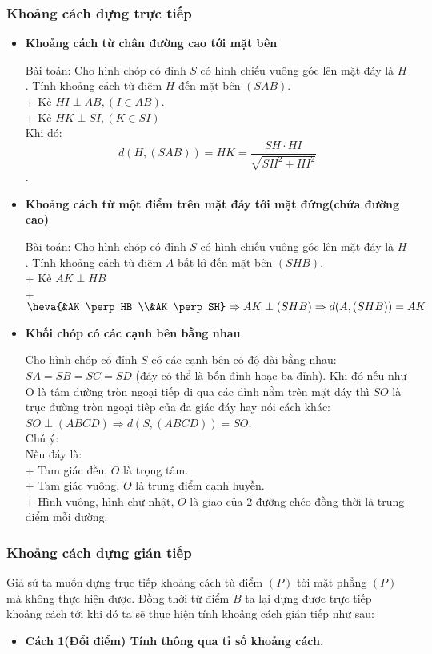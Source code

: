 \begin{khung}
\begin{itemize}
\end{itemize}
	\subsubsection{Khoảng cách dựng trực tiếp}
	\begin{itemize}
		\item \textbf{Khoảng cách từ chân đường cao tới mặt bên }
		
		Bài toán: Cho hình chóp có đỉnh $S$ có hình chiếu vuông góc lên mặt đáy là $H$. Tính khoảng cách từ điêm $H$ đến mặt bên $(S A B)$.\\
		+ Kẻ $H I \perp A B,(I \in A B)$.\\
		+ Kẻ $H K \perp S I,(K \in S I)$\\
		Khi đó: $$d(H,(S A B))=HK=\dfrac{SH \cdot HI}{\sqrt{S H^2+H I^2}}$$.\\
		
		\item \textbf{Khoảng cách từ một điểm trên mặt đáy tới mặt đứng(chứa đường cao)}
		
		Bài toán: Cho hình chóp có đỉnh $S$ có hình chiếu vuông góc lên mặt đáy là $H$. Tính khoảng cách tù điêm $A$ bất  kì đến mặt bên $(SHB)$.\\
		
		+ Kẻ $A K \perp H B$\\
		+ $\heva{&AK \perp HB \\&AK \perp SH} \Rightarrow AK \perp(SHB) \Rightarrow d(A,(S H B))=A K$
	
		\item \textbf{Khối chóp có các cạnh bên bằng nhau}
		
		Cho hình chóp có đỉnh $S$ có các cạnh bên có độ dài bằng nhau: $S A=S B=S C=S D$ (đáy có thể là bốn đỉnh hoạc ba đỉnh). Khi đó nếu như O là tâm đường tròn ngoại tiếp đi qua các đỉnh nằm trên mặt đáy thì $SO$ là trục đường tròn ngoại tiêp của đa giác đáy hay nói cách khác: $S O \perp(A B C D) \Rightarrow d(S,(A B C D))=S O$.\\
		Chú ý:\\
		Nếu đáy là:\\
		+ Tam giác đều, $O$ là trọng tâm.\\
		+ Tam giác vuông, $O$ là trung điểm cạnh huyền.\\
		+ Hình vuông, hình chữ nhật, $O$ là giao của 2 đường chéo đồng thời là trung điểm mỗi đường.
	\end{itemize}

	\subsubsection{Khoảng cách dựng gián tiếp}
	Giả sử ta muốn dựng trục tiếp khoảng cách tù điểm $(P)$ tới mặt phẳng $(P)$ mà không thực hiện được. Đồng thời từ điểm $B$ ta lại dựng được trực tiếp khoảng cách tới khi đó ta sẽ thục hiện tính khoảng cách gián tiếp như sau:
	\begin{itemize}
		\item \textbf{Cách 1(Đổi điểm) Tính thông qua tỉ số khoảng cách.}


\end{itemize}
\end{khung}

